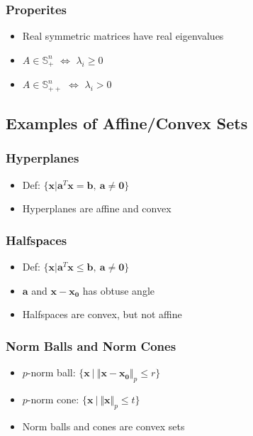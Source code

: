 \subsubsection*{Properites}
\begin{itemize}
    \item Real symmetric matrices have real eigenvalues
    \item $A \in \mathbb{S}^n_+$ $\Leftrightarrow$ $\lambda_i \geq 0$
    \item $A \in \mathbb{S}^n_{++}$ $\Leftrightarrow$ $\lambda_i > 0$
\end{itemize}

\subsection{Examples of Affine/Convex Sets}

\subsubsection*{Hyperplanes}
\begin{itemize}
    \item Def: $\{\mathbf{x}|\mathbf{a}^T\mathbf{x} = \mathbf{b},~\mathbf{a} \neq \mathbf{0}\}$
    \item Hyperplanes are affine and convex
\end{itemize}

\subsubsection*{Halfspaces}
\begin{itemize}
    \item Def: $\{\mathbf{x}|\mathbf{a}^T\mathbf{x} \leq \mathbf{b},~\mathbf{a}\neq\mathbf{0}\}$
    \item $\mathbf{a}$ and $\mathbf{x} - \mathbf{x_0}$ has obtuse angle
    \item Halfspaces are convex, but not affine
\end{itemize}

\subsubsection*{Norm Balls and Norm Cones}
\begin{itemize}
    \item $p$-norm ball: $\{\mathbf{x}~|~\Vert \mathbf{x} - \mathbf{x_0} \Vert_p \leq r\}$
    \item $p$-norm cone: $\{\mathbf{x}~|~\Vert \mathbf{x} \Vert_p \leq t\}$
    \item Norm balls and cones are convex sets
\end{itemize}

